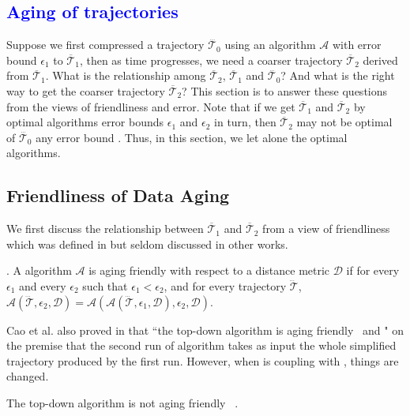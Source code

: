 
\textcolor{blue}{\section{Aging of trajectories}}
\label{sec-aging}

Suppose we first compressed a trajectory $\dddot{\mathcal{T}_0}$ using an \lsa algorithm $\mathcal{A}$ with error bound $\epsilon_1$ to $\overline{\mathcal{T}}_1$, then as time progresses, we need a coarser trajectory $\overline{\mathcal{T}}_2$ derived from $\overline{\mathcal{T}}_1$. 
What is the relationship among $\overline{\mathcal{T}}_2$, $\overline{\mathcal{T}}_1$ and $\dddot{\mathcal{T}_0}$? And what is the right way to get the coarser trajectory $\overline{\mathcal{T}}_2$?
%
This section is to answer these questions from the views of friendliness \cite{Cao:Spatio} and error.
Note that if we get $\overline{\mathcal{T}}_1$ and $\overline{\mathcal{T}}_2$ by optimal algorithms \wrt error bounds $\epsilon_1$ and $\epsilon_2$ in turn, then $\overline{\mathcal{T}}_2$ may not be optimal of $\dddot{\mathcal{T}_0}$ \wrt any error bound \cite{Cao:Spatio}. Thus, in this section, we let alone the optimal algorithms.

\subsection{Friendliness of Data Aging}
We first discuss the relationship between $\overline{\mathcal{T}}_1$ and $\overline{\mathcal{T}}_2$ from a view of friendliness which was defined in \cite{Cao:Spatio} but seldom discussed in other works.
	
. {A \lsa algorithm $\mathcal{A}$ is aging friendly with respect to a distance metric $\mathcal{D}$ if for every $\epsilon_1$ and every $\epsilon_2$ such that $\epsilon_1 < \epsilon_2$, and for every trajectory $\dddot{\mathcal{T}}$, $\mathcal{A}(\dddot{\mathcal{T}}, \epsilon_2, \mathcal{D})= \mathcal{A}(\mathcal{A}(\dddot{\mathcal{T}}, \epsilon_1, \mathcal{D}), \epsilon_2, \mathcal{D})$.}

Cao et al. also proved in \cite{Cao:Spatio} that ``the top-down algorithm \dpa is aging friendly \wrt~\ped and \sed" on the premise that the second run of algorithm \dpa takes as input the whole simplified trajectory produced by the first run. However, when \dpa is coupling with \dad, things are changed.


\begin{theorem}
	\label{theo-aging-dp-dad}
	The top-down algorithm \dpa is not aging friendly \wrt~\dad.
\end{theorem}

